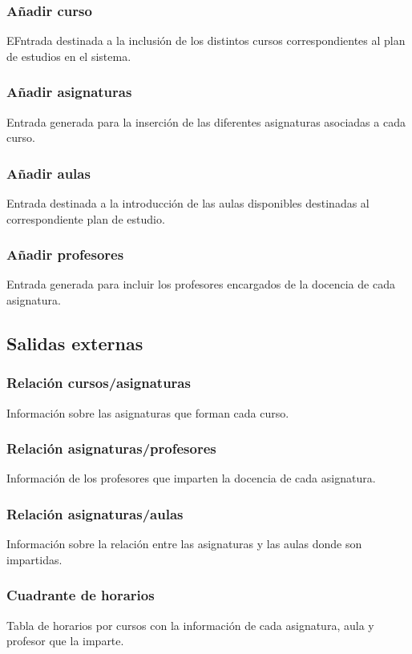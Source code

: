 \documentclass[11pt,a4paper,spanish,twoside]{book}
\begin{document}
\subsubsection{Añadir curso}
EFntrada destinada a la inclusión de los distintos cursos correspondientes al
plan de estudios en el sistema.

\subsubsection{Añadir asignaturas}
Entrada generada para la inserción de las diferentes asignaturas asociadas a
cada curso.

\subsubsection{Añadir aulas}
Entrada destinada a la introducción de las aulas disponibles destinadas al
correspondiente plan de estudio.

\subsubsection{Añadir profesores}
Entrada generada para incluir los profesores encargados de la docencia de
cada asignatura.

\subsection{Salidas externas}
\subsubsection{Relación cursos/asignaturas}
Información sobre las asignaturas que forman cada curso.

\subsubsection{Relación asignaturas/profesores}
Información de los profesores que imparten la docencia de cada asignatura.

\subsubsection{Relación asignaturas/aulas}
Información sobre la relación entre las asignaturas y las aulas donde son
impartidas. 

\subsubsection{Cuadrante de horarios}
Tabla de horarios por cursos con la información de cada asignatura, aula y
profesor que la imparte.
\end{document}
